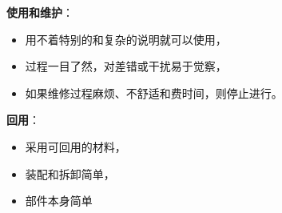 \documentclass[letterpaper,10pt,english]{sphinxmanual}
\begin{document}
\textbf{使用和维护}：
\begin{itemize}
\item {} 
用不着特别的和复杂的说明就可以使用，

\item {} 
过程一目了然，对差错或干扰易于觉察，

\item {} 
如果维修过程麻烦、不舒适和费时间，则停止进行。

\end{itemize}

\textbf{回用}：
\begin{itemize}
\item {} 
采用可回用的材料，

\item {} 
装配和拆卸简单，

\item {} 
部件本身简单

\end{itemize}
\end{document}
